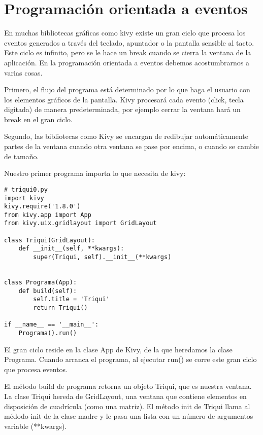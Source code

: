 
\section{Programación orientada a eventos}

En muchas bibliotecas gráficas como kivy existe un gran ciclo que procesa
los eventos generados a través del teclado, apuntador o la pantalla
sensible al tacto. Este ciclo es infinito, pero se le hace un break
cuando se cierra la ventana de la aplicación. En la programación orientada
a eventos debemos acostumbrarnos a varias cosas.

Primero, el flujo del programa está determinado por lo que haga el usuario con
los elementos gráficos de la pantalla. Kivy procesará cada evento (click,
tecla digitada) de manera predeterminada, por ejemplo cerrar la
ventana hará un break en el gran ciclo.


Segundo, las bibliotecas como Kivy se encargan de redibujar automáticamente 
partes de la ventana cuando otra ventana se pase por encima, o cuando se cambie de tamaño.

Nuestro primer programa importa lo que necesita de kivy:

\beforeverb
\begin{verbatim}
# triqui0.py
import kivy
kivy.require('1.8.0')
from kivy.app import App
from kivy.uix.gridlayout import GridLayout

class Triqui(GridLayout):
    def __init__(self, **kwargs):
        super(Triqui, self).__init__(**kwargs)
   

class Programa(App):
    def build(self):
        self.title = 'Triqui'
        return Triqui()

if __name__ == '__main__':
    Programa().run()
\end{verbatim}
\afterverb

El gran ciclo reside en la clase App de Kivy, de la que heredamos la clase
Programa. Cuando arranca el programa, al ejecutar run() se corre este
gran ciclo que procesa eventos.

El método build de programa retorna un objeto Triqui, que es nuestra ventana.
La clase Triqui hereda de GridLayout, una ventana que contiene elementos
en disposición de cuadrícula (como una matriz). El método init de Triqui
llama al médodo init de la clase madre y le pasa una lista con un número
de argumentos variable (**kwargs). 

